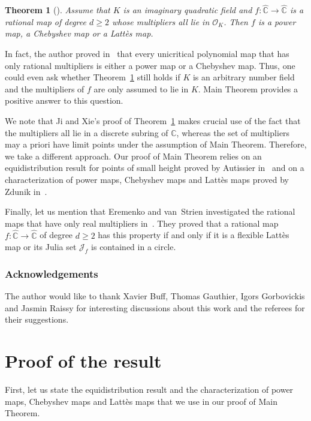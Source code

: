 \documentclass[JEP,XML,SOM,Unicode,published]{cedram}
\theoremstyle{plain}
\newtheorem{theorem}{Theorem}
\theoremstyle{definition}
\theoremstyle{remark}
\begin{document}
\begin{theorem}[{\cite[Th.\,1.13]{JX2022}}]
\label{theorem:milnor}
Assume that $K$ is an imaginary quadratic field and $f \colon \widehat{\mathbb{C}} \to \widehat{\mathbb{C}}$ is a rational map of degree $d \geq 2$ whose multipliers all lie in $\mathcal{O}_{K}$. Then $f$ is a power map, a Chebyshev map or a Lattès map.
\end{theorem}

In fact, the author proved in~\cite{H2021} that every unicritical polynomial map that has only rational multipliers is either a power map or a Chebyshev map. Thus, one could even ask whether Theorem~\ref{theorem:milnor} still holds if $K$ is an arbitrary number field and the multipliers of $f$ are only assumed to lie in $K$. Main Theorem provides a positive answer to this question.

We note that Ji and Xie's proof of Theorem~\ref{theorem:milnor} makes crucial use of the fact that the multipliers all lie in a discrete subring of $\mathbb{C}$, whereas the set of multipliers may a priori have limit points under the assumption of Main Theorem. Therefore, we take a different approach. Our proof of Main Theorem relies on an equidistribution result for points of small height proved by Autissier in~\cite{A2001} and on a characterization of power maps, Chebyshev maps and Lattès maps proved by Zdunik in~\cite{Z2014}.

Finally, let us mention that Eremenko and van~Strien investigated the rational maps that have only real multipliers in~\cite{EvS2011}. They proved that a rational map $f \colon \widehat{\mathbb{C}} \to \widehat{\mathbb{C}}$ of degree $d \geq 2$ has this property if and only if it is a flexible Lattès map or its Julia set $\mathcal{J}_{f}$ is contained in a circle.

\subsubsection*{Acknowledgements}
The author would like to thank Xavier Buff, Thomas Gauthier, Igors Gorbovickis and Jasmin Raissy for interesting discussions about this work and the referees for their suggestions.

\section{Proof of the result}

First, let us state the equidistribution result and the characterization of power maps, Chebyshev maps and Lattès maps that we use in our proof of Main Theorem.
\end{document}
